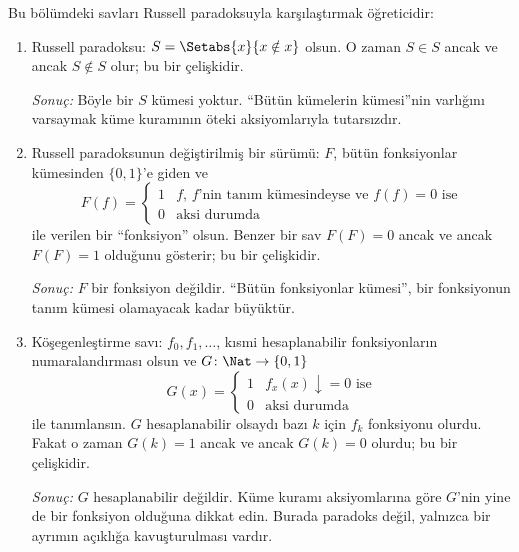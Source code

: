 


Bu bölümdeki savları Russell paradoksuyla karşılaştırmak öğreticidir:
\begin{enumerate}
\item Russell paradoksu: $S=\Setabs{x}{x\notin x}$ olsun. O zaman
  $S\in S$ ancak ve ancak $S\notin S$ olur; bu bir çelişkidir.

  \emph{Sonuç:} Böyle bir $S$ kümesi yoktur. ``Bütün kümelerin kümesi''nin
  varlığını varsaymak küme kuramının öteki aksiyomlarıyla tutarsızdır.

\item Russell paradoksunun değiştirilmiş bir sürümü: $F$, bütün fonksiyonlar
  kümesinden $\{0,1\}$'e giden ve
  \[
    F(f)=\begin{cases}
      1 & \text{$f$, $f$'nin tanım kümesindeyse ve $f(f)=0$ ise}\\
      0 & \text{aksi durumda}
    \end{cases}
  \]
  ile verilen bir ``fonksiyon'' olsun. Benzer bir sav
  $F(F)=0$ ancak ve ancak $F(F)=1$ olduğunu gösterir; bu bir çelişkidir.

  \emph{Sonuç:} $F$ bir fonksiyon değildir. ``Bütün fonksiyonlar kümesi'',
  bir fonksiyonun tanım kümesi olamayacak kadar büyüktür.

\item Köşegenleştirme savı: $f_0,f_1,\dots$, kısmi hesaplanabilir
  fonksiyonların numaralandırması olsun ve $G\colon\Nat\to\{0,1\}$
  \[
    G(x)=\begin{cases}
      1 & \text{$f_x(x)\downarrow=0$ ise}\\
      0 & \text{aksi durumda}
    \end{cases}
  \]
  ile tanımlansın. $G$ hesaplanabilir olsaydı bazı $k$ için $f_k$ fonksiyonu
  olurdu. Fakat o zaman $G(k)=1$ ancak ve ancak $G(k)=0$ olurdu; bu bir
  çelişkidir.

  \emph{Sonuç:} $G$ hesaplanabilir değildir. Küme kuramı aksiyomlarına göre
  $G$'nin yine de bir fonksiyon olduğuna dikkat edin. Burada paradoks değil,
  yalnızca bir ayrımın açıklığa kavuşturulması vardır.
\end{enumerate}

